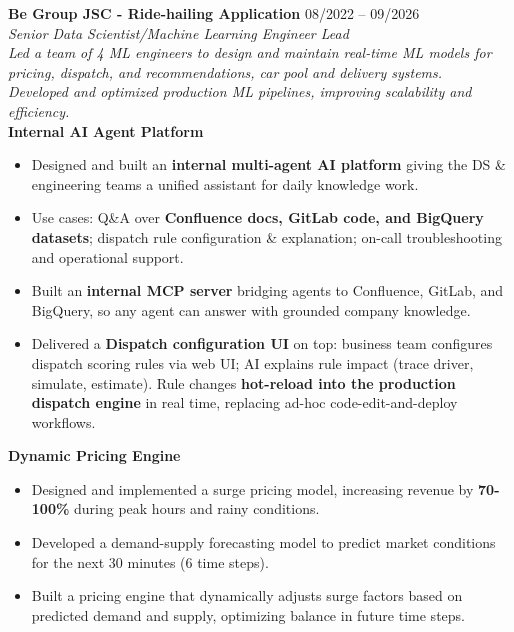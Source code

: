 \documentclass[10pt, letterpaper]{article}
\newenvironment{zitemize}{
\begin{itemize} \itemsep 0pt \parskip 0pt \parsep 1pt}
{\end{itemize}\vspace{-.5em}}
\begin{document}
\textbf{Be Group JSC - Ride-hailing Application} \hfill 08/2022 – 09/2026 \\
\textit{Senior Data Scientist/Machine Learning Engineer Lead} \\
\vspace{2mm}
\textit{\small{Led a team of 4 ML engineers to design and maintain real-time ML models for pricing, dispatch, and recommendations, car pool and delivery systems. \\
Developed and optimized production ML pipelines, improving scalability and efficiency.}}\\
\vspace{2mm}
\textbf{\small{Internal AI Agent Platform}}
\begin{zitemize}
    \vspace{-1mm}\item \small{Designed and built an \textbf{internal multi-agent AI platform} giving the DS \& engineering teams a unified assistant for daily knowledge work.}
    \item \small{Use cases: Q\&A over \textbf{Confluence docs, GitLab code, and BigQuery datasets}; dispatch rule configuration \& explanation; on-call troubleshooting and operational support.}
    \item \small{Built an \textbf{internal MCP server} bridging agents to Confluence, GitLab, and BigQuery, so any agent can answer with grounded company knowledge.}
    \item \small{Delivered a \textbf{Dispatch configuration UI} on top: business team configures dispatch scoring rules via web UI; AI explains rule impact (trace driver, simulate, estimate). Rule changes \textbf{hot-reload into the production dispatch engine} in real time, replacing ad-hoc code-edit-and-deploy workflows.}
\end{zitemize}

\textbf{\small{Dynamic Pricing Engine}}
\begin{zitemize}
    \vspace{-1mm}\item \small{Designed and implemented a surge pricing model, increasing revenue by \textbf{70-100\%} during peak hours and rainy conditions.}
    \item \small{Developed a demand-supply forecasting model to predict market conditions for the next 30 minutes (6 time steps).}
    \item \small{Built a pricing engine that dynamically adjusts surge factors based on predicted demand and supply, optimizing balance in future time steps.}
\end{zitemize}
\end{document}
